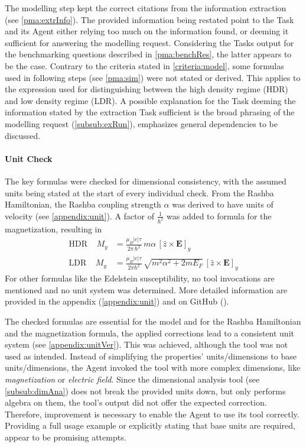 \documentclass[
	fontsize = 11pt,
	paper = a4,
	draft = false,
	twoside = true,
	titlepage = false
]{scrartcl}
\numberwithin{equation}{subsection}
\begin{document}
	The modelling step kept the correct citations from the information extraction (see \autoref{pma:extrInfo}). The provided information being restated point to the Task and its \gls{Agent} either relying too much on the information found, or deeming it sufficient for answering the modelling request. Considering the Tasks output for the benchmarking questions described in \autoref{pma:benchRes}, the latter appears to be the case. Contrary to the criteria stated in \autoref{criteria:model}, some formulas used in following steps (see \autoref{pma:sim}) were not stated or derived. This applies to the expression used for distinguishing between the high density regime (HDR) and low density regime (LDR). A possible explanation for the Task deeming the information stated by the extraction Task sufficient is the broad phrasing of the modelling request (\autoref{subsub:exRun}), emphasizes general dependencies to be discussed.
	
	\paragraph{Unit Check} \label{pma:unitCheck}
	The key formulas were checked for dimensional consistency, with the assumed units being stated at the start of every individual check. From the Rashba Hamiltonian, the Rashba coupling strength $\alpha$ was derived to have units of velocity (see \autoref{appendix:unit}). A factor of $\frac{1}{\hbar^2}$ was added to formula for the magnetization, resulting in
	\begin{align}
		\text{HDR} \ \ \ \ \ M_y &= \frac{\mu_B |e|\tau}{2\pi\, \hbar^2}\,m\alpha\,[\hat{z}\times\mathbf{E}]_y \label{HDRMag}\\
		\text{LDR} \ \ \ \ \ M_y &= \frac{\mu_B |e|\tau}{2\pi \hbar^2}\,\sqrt{m^2\alpha^2 + 2mE_F}\,[\hat{z}\times\mathbf{E}]_y \label{LDRMag}
	\end{align}
	For other formulas like the Edelstein susceptibility, no tool invocations are mentioned and no unit system was determined. More detailed information are provided in the appendix (\autoref{appendix:unit}) and on GitHub (\autocite{gitUnit}).
	
	The checked formulas are essential for the model and for the Rashba Hamiltonian and the magnetization formula, the applied corrections lead to a consistent unit system (see \autoref{appendix:unitVer}). This was achieved, although the tool was not used as intended. Instead of simplifying the properties' units/dimensions to base units/dimensions, the \gls{Agent} invoked the tool with more complex dimensions, like \textit{magnetization} or \textit{electric field}. Since the dimensional analysis tool (see \autoref{subsub:dimAna}) does not break the provided units down, but only performs algebra on them, the tool's output did not offer the expected correction. Therefore, improvement is necessary to enable the \gls{Agent} to use its tool correctly. Providing a full usage example or explicitly stating that base units are required, appear to be promising attempts.
	
\end{document}
